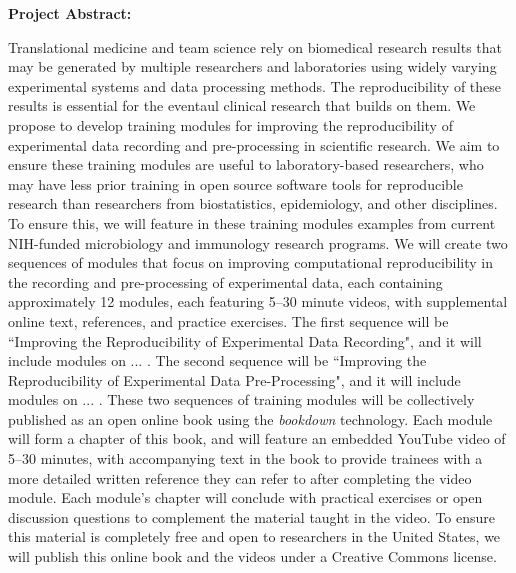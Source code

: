 \documentclass[pdftex,english,11.5pt,parskip=half]{scrartcl}
\begin{document}
\def\bf{\normalfont\bfseries}
\pagestyle{empty}

{\large \textbf{Project Abstract:}}


Translational medicine and team science rely on biomedical research results 
that may be generated by multiple researchers and laboratories using widely 
varying experimental systems and data processing methods. The reproducibility
of these results is essential for the eventaul clinical research that builds
on them.  We propose to develop training modules for improving the 
reproducibility of experimental data recording and pre-processing in 
scientific research. We aim to ensure these training modules are useful to laboratory-based researchers, who may have less prior training in open source software tools for reproducible research than researchers from biostatistics, epidemiology, and other disciplines. To ensure this, we will feature in these training modules examples from current 
NIH-funded microbiology and immunology research programs. We will create two sequences of modules that focus on improving computational reproducibility in the recording and pre-processing of experimental data, each containing approximately 12 modules, each featuring 5--30 minute videos, with supplemental online text, references, and practice exercises. The first sequence will be ``Improving the Reproducibility of Experimental Data Recording", and it will include modules on ... . The second sequence will be ``Improving the Reproducibility of Experimental Data Pre-Processing", and it will include modules on ... . These two sequences of training modules will be collectively published as an open online book using the \textit{bookdown} technology. Each module will form a chapter of this book, and will feature an embedded YouTube video of 5--30 minutes, with accompanying text in the book to provide trainees with a more detailed written reference they can refer to after completing the video module. Each module's chapter will conclude with practical exercises or open discussion questions to complement the material taught in the video. To ensure this material is completely free and open to researchers in the United States, we will publish this online book and the videos under a Creative Commons license.
\end{document}
